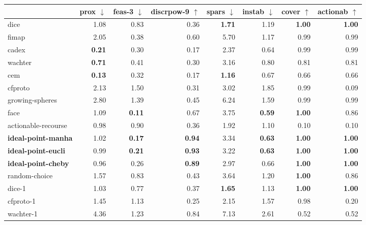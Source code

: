 \begin{tabular}{lrrrrrrr} \hline
 & prox $\downarrow$& feas-3 $\downarrow$& discrpow-9 $\uparrow$& spars $\downarrow$& instab $\downarrow$& cover $\uparrow$& actionab $\uparrow$\\ \hline
dice & 1.08 & 0.83 & 0.36 & \bfseries 1.71 & 1.19 & \bfseries 1.00 & \bfseries 1.00 \\ \hline
fimap & 2.05 & 0.38 & 0.60 & 5.70 & 1.17 & 0.99 & 0.99 \\ \hline
cadex & \bfseries 0.21 & 0.30 & 0.17 & 2.37 & 0.64 & 0.99 & 0.99 \\ \hline
wachter & \bfseries 0.71 & 0.41 & 0.30 & 3.16 & 0.80 & 0.81 & 0.81 \\ \hline
cem & \bfseries 0.13 & 0.32 & 0.17 & \bfseries 1.16 & 0.67 & 0.66 & 0.66 \\ \hline
cfproto & 2.13 & 1.50 & 0.31 & 3.02 & 1.85 & 0.99 & 0.09 \\ \hline
growing-spheres & 2.80 & 1.39 & 0.45 & 6.24 & 1.59 & 0.99 & 0.99 \\ \hline
face & 1.09 & \bfseries 0.11 & 0.67 & 3.75 & \bfseries 0.59 & \bfseries 1.00 & 0.86 \\ \hline
actionable-recourse & 0.98 & 0.90 & 0.36 & 1.92 & 1.10 & 0.10 & 0.10 \\ \hline
\bfseries ideal-point-manha & 1.02 & \bfseries 0.17 & \bfseries 0.94 & 3.34 & \bfseries 0.63 & \bfseries 1.00 & \bfseries 1.00 \\ \hline
\bfseries ideal-point-eucli & 0.99 & \bfseries 0.21 & \bfseries 0.93 & 3.22 & \bfseries 0.63 & \bfseries 1.00 & \bfseries 1.00 \\ \hline
\bfseries ideal-point-cheby & 0.96 & 0.26 & \bfseries 0.89 & 2.97 & 0.66 & \bfseries 1.00 & \bfseries 1.00 \\ \hline
random-choice & 1.57 & 0.83 & 0.43 & 3.64 & 1.20 & \bfseries 1.00 & 0.86 \\ \hline
dice-1 & 1.03 & 0.77 & 0.37 & \bfseries 1.65 & 1.13 & \bfseries 1.00 & \bfseries 1.00 \\ \hline
cfproto-1 & 1.45 & 1.13 & 0.25 & 2.15 & 1.57 & 0.98 & 0.20 \\ \hline
wachter-1 & 4.36 & 1.23 & 0.84 & 7.13 & 2.61 & 0.52 & 0.52 \\ \hline
\end{tabular}
